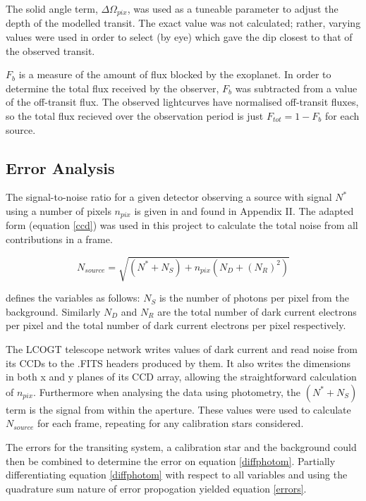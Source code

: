 \documentclass{report}
\begin{document}
The solid angle term, $\Delta \Omega_{pix}$, was used as a tuneable parameter to adjust the depth of the modelled transit. The exact value was not calculated; rather, varying values were used in order to select (by eye) which gave the dip closest to that of the observed transit.

$F_{b}$ is a measure of the amount of flux blocked by the exoplanet. In order to determine the total flux received by the observer, $F_{b}$ was subtracted from a value of the off-transit flux. The observed lightcurves have normalised off-transit fluxes, so the total flux recieved over the observation period is just $F_{tot} = 1 - F_{b}$ for each source. 

\subsection{Error Analysis}
The signal-to-noise ratio for a given detector observing a source with signal $N^{*}$ using a number of pixels $n_{pix}$ is given in \textcite{howell} and found in Appendix II. The adapted form (equation \ref{ccd}) was used in this project to calculate the total noise from all contributions in a frame.

\begin{equation} \label{ccd}
    N_{source} = \sqrt{(N^{*}+N_{S})+n_{pix}(N_{D}+(N_{R})^2)}
\end{equation}

\citeauthor{howell} defines the variables as follows: $N_{S}$ is the number of photons per pixel from the background. Similarly $N_{D}$ and $N_{R}$ are the total number of dark current electrons per pixel and the total number of dark current electrons per pixel respectively. 

The LCOGT telescope network writes values of dark current and read noise from its CCDs to the .FITS headers produced by them. It also writes the dimensions in both x and y planes of its CCD array, allowing the straightforward calculation of $n_{pix}$. Furthermore when analysing the data using photometry, the $(N^{*}+N_{S})$ term is the signal from within the aperture. These values were used to calculate $N_{source}$ for each frame, repeating for any calibration stars considered. 

The errors for the transiting system, a calibration star and the background could then be combined to determine the error on equation \ref{diffphotom}. Partially differentiating equation \ref{diffphotom} with respect to all variables and using the quadrature sum nature of error propogation yielded equation \ref{errors}.
\end{document}
